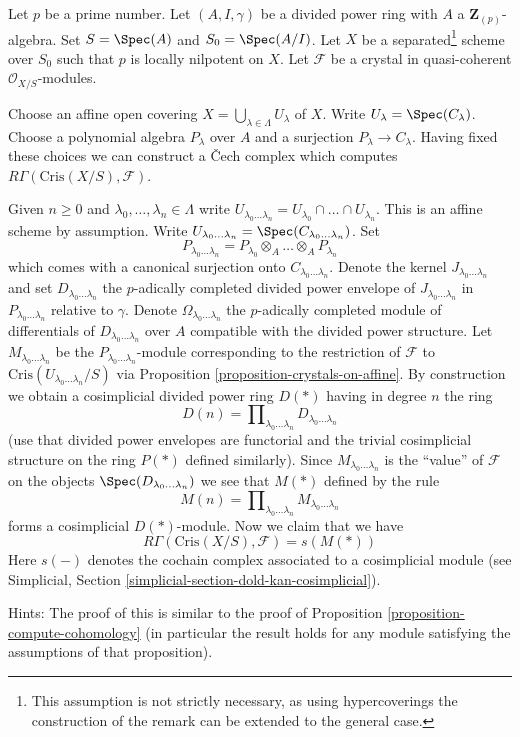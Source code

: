 \begin{remark}
\label{remark-cech-complex}
Let $p$ be a prime number. Let $(A, I, \gamma)$ be a divided power
ring with $A$ a $\mathbf{Z}_{(p)}$-algebra. Set $S = \Spec(A)$ and
$S_0 = \Spec(A/I)$. Let $X$ be a separated\footnote{This assumption is
not strictly necessary, as using hypercoverings the construction of the
remark can be extended to the general case.} scheme over
$S_0$ such that $p$ is locally nilpotent on $X$. Let $\mathcal{F}$ be a
crystal in quasi-coherent $\mathcal{O}_{X/S}$-modules.

\medskip\noindent
Choose an affine open covering
$X = \bigcup_{\lambda \in \Lambda} U_\lambda$ of $X$.
Write $U_\lambda = \Spec(C_\lambda)$. Choose a polynomial algebra
$P_\lambda$ over $A$ and a surjection $P_\lambda \to C_\lambda$.
Having fixed these choices we can construct a {\v C}ech complex which
computes $R\Gamma(\text{Cris}(X/S), \mathcal{F})$.

\medskip\noindent
Given $n \geq 0$ and $\lambda_0, \ldots, \lambda_n \in \Lambda$
write $U_{\lambda_0 \ldots \lambda_n} = U_{\lambda_0} \cap \ldots
\cap U_{\lambda_n}$. This is an affine scheme by assumption. Write
$U_{\lambda_0 \ldots \lambda_n} = \Spec(C_{\lambda_0 \ldots \lambda_n})$.
Set
$$
P_{\lambda_0 \ldots \lambda_n} =
P_{\lambda_0} \otimes_A \ldots \otimes_A P_{\lambda_n}
$$
which comes with a canonical surjection onto $C_{\lambda_0 \ldots \lambda_n}$.
Denote the kernel $J_{\lambda_0 \ldots \lambda_n}$ and set
$D_{\lambda_0 \ldots \lambda_n}$
the $p$-adically completed divided power envelope of
$J_{\lambda_0 \ldots \lambda_n}$ in $P_{\lambda_0 \ldots \lambda_n}$
relative to $\gamma$. Denote $\Omega_{\lambda_0 \ldots \lambda_n}$
the $p$-adically completed module of differentials of
$D_{\lambda_0 \ldots \lambda_n}$ over $A$ compatible with the divided power
structure. Let $M_{\lambda_0 \ldots \lambda_n}$ be the
$P_{\lambda_0 \ldots \lambda_n}$-module corresponding
to the restriction of $\mathcal{F}$ to
$\text{Cris}(U_{\lambda_0 \ldots \lambda_n}/S)$ via
Proposition \ref{proposition-crystals-on-affine}.
By construction we obtain a cosimplicial divided power ring $D(*)$
having in degree $n$ the ring
$$
D(n) =
\prod\nolimits_{\lambda_0 \ldots \lambda_n}
D_{\lambda_0 \ldots \lambda_n}
$$
(use that divided power envelopes are functorial and the trivial
cosimplicial structure on the ring $P(*)$ defined similarly).
Since $M_{\lambda_0 \ldots \lambda_n}$ is the ``value'' of $\mathcal{F}$
on the objects $\Spec(D_{\lambda_0 \ldots \lambda_n})$ we see that
$M(*)$ defined by the rule
$$
M(n) = \prod\nolimits_{\lambda_0 \ldots \lambda_n}
M_{\lambda_0 \ldots \lambda_n}
$$
forms a cosimplicial $D(*)$-module. Now we claim that we have
$$
R\Gamma(\text{Cris}(X/S), \mathcal{F}) = s(M(*))
$$
Here $s(-)$ denotes the cochain complex associated to a cosimplicial
module (see
Simplicial, Section \ref{simplicial-section-dold-kan-cosimplicial}).

\medskip\noindent
Hints: The proof of this is similar to the proof of
Proposition \ref{proposition-compute-cohomology} (in particular
the result holds for any module satisfying the assumptions of
that proposition).
\end{remark}

